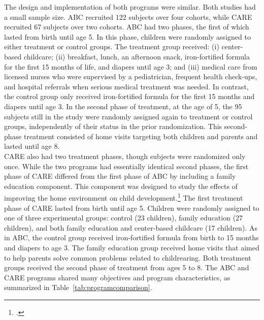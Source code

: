 \noindent The design and implementation of both programs were similar. Both studies had a small sample size. ABC recruited 122 subjects over four cohorts, while CARE recruited 67 subjects over two cohorts. ABC had two phases, the first of which lasted from birth until age 5. In this phase, children were randomly assigned to either treatment or control groups. The treatment group received: (i) center-based childcare; (ii) breakfast, lunch, an afternoon snack, iron-fortified formula for the first 15 months of life, and diapers until age 3; and (iii) medical care from licensed nurses who were supervised by a pediatrician, frequent health check-ups, and hospital referrals when serious medical treatment was needed. In contrast, the control group only received iron-fortified formula for the first 15 months and diapers until age 3. In the second phase of treatment, at the age of 5, the 95 subjects still in the study were randomly assigned again to treatment or control groups, independently of their status in the prior randomization. This second-phase treatment consisted of home visits targeting both children and parents and lasted until age 8.\\ 

\noindent  CARE also had two treatment phases, though subjects were randomized only once. While the two programs had essentially identical second phases, the first phase of CARE differed from the first phase of ABC by including a family education component. This component was designed to study the effects of improving the home environment on child development.\footnote{\citet{Wasik_Ramey_etal_1990_CD}.} The first treatment phase of CARE lasted from birth until age 5. Children were randomly assigned to one of three experimental groups: control (23 children), family education (27 children), and both family education and center-based childcare (17 children). As in ABC, the control group received iron-fortified formula from birth to 15 months and diapers to age 3. The family education group received home visits that aimed to help parents solve common problems related to childrearing. Both treatment groups received the second phase of treatment from ages 5 to 8. The ABC and CARE programs shared many objectives and program characteristics, as summarized in Table~\ref{tab:programcomparison}.



